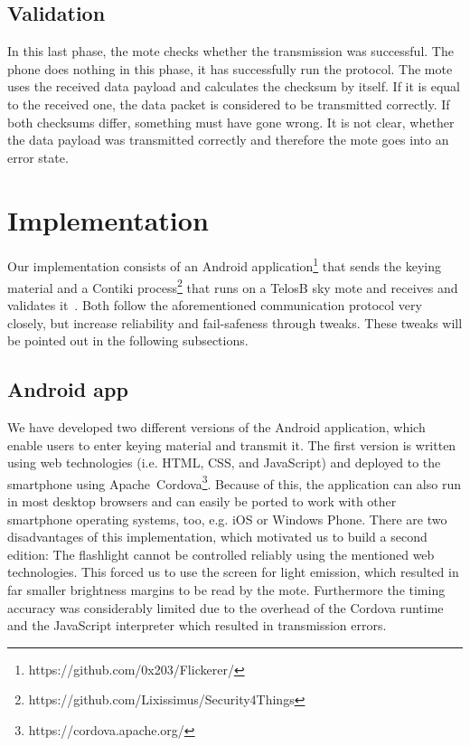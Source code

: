 \documentclass{ewsn-proc} %
\begin{document}
\subsection{Validation}
\label{sub:validation}

In this last phase, the mote checks whether the transmission was successful.
The phone does nothing in this phase, it has successfully run the protocol.
The mote uses the received data payload and calculates the checksum by itself.
If it is equal to the received one, the data packet is considered to be transmitted correctly.
If both checksums differ, something must have gone wrong.
It is not clear, whether the data payload was transmitted correctly and therefore the mote goes into an error state.

\section{Implementation}
\label{sec:implementation}

Our implementation consists of an Android application\footnote{https://github.com/0x203/Flickerer/} that sends the keying material and a Contiki process\footnote{https://github.com/Lixissimus/Security4Things} that runs on a TelosB sky mote and receives and validates it~\cite{telosb}.
Both follow the aforementioned communication protocol very closely, but increase reliability and fail-safeness through tweaks. 
These tweaks will be pointed out in the following subsections.

\subsection{Android app}
\label{sub:android_app}

We have developed two different versions of the Android application, which enable users to enter keying material and transmit it.
The first version is written using web technologies (i.e. HTML, CSS, and JavaScript) and deployed to the smartphone using Apache~Cordova\footnote{https://cordova.apache.org/}.
Because of this, the application can also run in most desktop browsers and can easily be ported to work with other smartphone operating systems, too, e.g. iOS or Windows Phone.
There are two disadvantages of this implementation, which motivated us to build a second edition:
The flashlight cannot be controlled reliably using the mentioned web technologies.
This forced us to use the screen for light emission, which resulted in far smaller brightness margins to be read by the mote.
Furthermore the timing accuracy was considerably limited due to the overhead of the Cordova runtime and the JavaScript interpreter which resulted in transmission errors.
\end{document}

